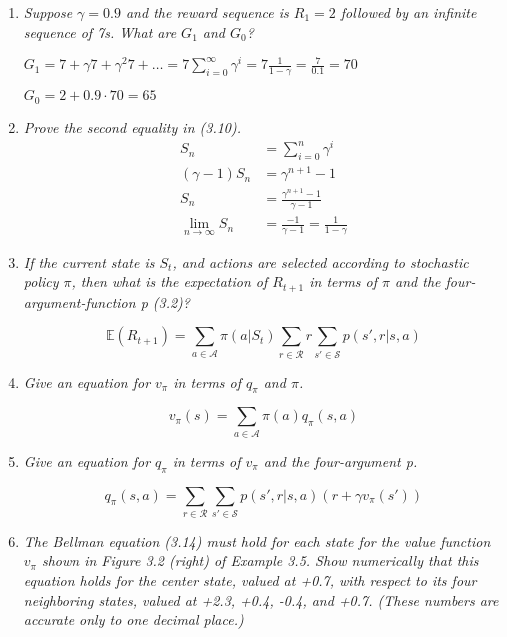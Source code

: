 \documentclass[12pt,a4paper]{article}
\begin{document}
\begin{enumerate}
\item
  \textit{Suppose $\gamma = 0.9$ and the reward sequence is $R_1 = 2$ followed by an infinite
  sequence of 7s. What are $G_1$ and $G_0$?}

  $G_1 = 7 + \gamma 7 + \gamma^2 7 + \dots = 7 \sum\limits_{i = 0}^{\infty} \gamma^i =
  7 \frac{1}{1 - \gamma} = \frac{7}{0.1} = 70$

  $G_0 = 2 + 0.9 \cdot 70 = 65$

\item
  \textit{Prove the second equality in (3.10).}
  \begin{align*}
    S_n &= \sum\limits_{i = 0}^n \gamma^i\\
    (\gamma - 1)S_n &= \gamma^{n + 1} - 1\\
    S_n &= \frac{\gamma^{n + 1} - 1}{\gamma - 1}\\
    \lim_{n \to \infty} S_n &= \frac{ - 1}{\gamma - 1} = \frac{1}{1 - \gamma}
  \end{align*}

\item
  \textit{If the current state is $S_t$, and actions are selected according to stochastic
  policy $\pi$, then what is the expectation of $R_{t+1}$ in terms of $\pi$ and the four-argument-function p (3.2)?}

  \[\mathbb{E}(R_{t + 1}) = \sum\limits_{a \in \mathcal{A}} \pi(a | S_t)
  \sum\limits_{r \in \mathcal{R}} r \sum\limits_{s' \in \mathcal{S}}p(s', r | s, a) \]

\item
  \textit{Give an equation for $v_{\pi}$ in terms of $q_{\pi}$ and $\pi$.}

  \[v_\pi(s) = \sum\limits_{a \in \mathcal{A}} \pi(a) q_\pi(s, a)\]

\item
  \textit{Give an equation for $q_{\pi}$ in terms of $v_{\pi}$ and the four-argument p.}

  \[
  q_\pi(s,a) = \sum\limits_{r \in \mathcal{R}} \sum\limits_{s' \in \mathcal{S}}p(s', r |s, a) (r + \gamma v_\pi(s'))
  \]

\item
  \textit{The Bellman equation (3.14) must hold for each state for the value function
  $v_\pi$ shown in Figure 3.2 (right) of Example 3.5. Show numerically that this equation holds
  for the center state, valued at +0.7, with respect to its four neighboring states, valued at
  +2.3, +0.4, -0.4, and +0.7. (These numbers are accurate only to one decimal place.)}


\end{enumerate}
\end{document}
